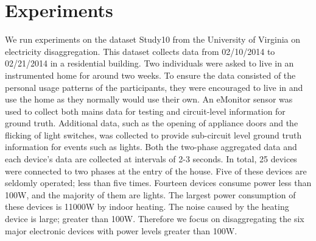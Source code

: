 \section{Experiments}
We run experiments on the dataset Study10 from the University of Virginia on electricity disaggregation. 
This dataset collects data from 02/10/2014 to 02/21/2014 in a residential building. 
Two individuals were asked to live in an instrumented home for around two weeks. 
To ensure the data consisted of the personal usage patterns of the participants, 
they were encouraged to live in and use the home as they normally would use their own. 
An eMonitor \cite{eMonitor} sensor was used to collect both mains data for testing and circuit-level information for ground truth. 
Additional data, such as the opening of appliance doors and the flicking of light switches, 
was collected to provide sub-circuit level ground truth information for events such as lights.
Both the two-phase aggregated data and each device's data are collected at intervals of 2-3 seconds.
In total, 25 devices were connected to two phases at the entry of the house. 
Five of these devices are seldomly operated; less than five times. 
Fourteen devices consume power less than 100W, and the majority of them are lights. 
The largest power consumption of these devices is 11000W by indoor heating. 
The noise caused by the heating device is large; greater than 100W. 
Therefore we focus on disaggregating the six major electronic devices 
with power levels greater than 100W. 
 
%

